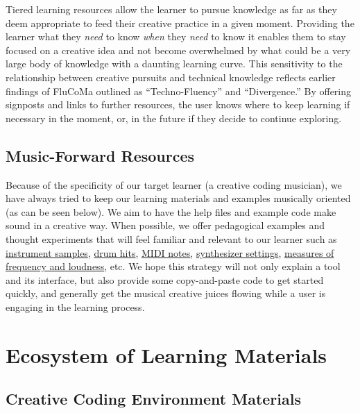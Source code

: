 \documentclass{article}
\begin{document}
Tiered learning resources allow the learner to pursue knowledge as far
as they deem appropriate to feed their creative practice in a given
moment. Providing the learner what they \emph{need} to know \emph{when}
they \emph{need} to know it enables them to stay focused on a creative
idea and not become overwhelmed by what could be a very large body of
knowledge with a daunting learning curve. This sensitivity to the
relationship between creative pursuits and technical knowledge reflects
earlier findings of FluCoMa outlined as ``Techno-Fluency''
and ``Divergence.'' \cite{green2019interdisciplinary} By offering signposts and links to further
resources, the user knows where to keep learning if necessary in the
moment, or, in the future if they decide to continue exploring.

\subsection{Music-Forward Resources}\label{music-forward-resources}

Because of the specificity of our target learner (a creative coding
musician), we have always tried to keep our learning materials and
examples musically oriented (as can be seen below). We aim to have the
help files and example code make sound in a creative way. When possible,
we offer pedagogical examples and thought experiments that will feel
familiar and relevant to our learner such as
\href{https://learn.flucoma.org/reference/noveltyfeature/}{instrument
samples},
\href{https://learn.flucoma.org/reference/bufstats/\#a-musical-example}{drum
hits},
\href{https://learn.flucoma.org/reference/bufstats/\#order-statistics}{MIDI
notes},
\href{https://learn.flucoma.org/learn/regression-neural-network/}{synthesizer
settings},
\href{https://learn.flucoma.org/learn/why-scale/\#plotting-sound-slices-where-1-hz--1-db}{measures
of frequency and loudness}, etc. We hope this strategy will not only
explain a tool and its interface, but also provide some
copy-and-paste code to get started quickly, and generally get the
musical creative juices flowing while a user is engaging in the learning
process.

\section{Ecosystem of Learning Materials}\label{ecosystem-of-learning-materials}

\subsection{Creative Coding Environment Materials}\label{creative-coding-environment-materials}
\end{document}
